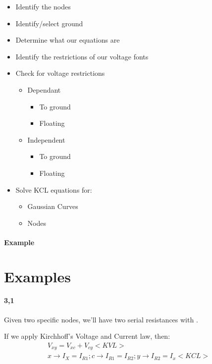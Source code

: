 \documentclass[11pt,fleqn]{book} %
\begin{document}
\begin{itemize}
    \item Identify the nodes
    \item Identify/select ground
    \item Determine what our equations are
    \item Identify the restrictions of our voltage fonts
    \item Check for voltage restrictions \begin{itemize}
        \item Dependant \begin{itemize}
            \item To ground
            \item Floating
        \end{itemize}
        \item Independent \begin{itemize}
            \item To ground 
            \item Floating
        \end{itemize}
    \end{itemize}
    \item Solve KCL equations for: \begin{itemize}
        \item Gaussian Curves
        \item Nodes
    \end{itemize}
\end{itemize}

\paragraph{Example}

\section{Examples}

\paragraph{3,1}

Given two specific nodes, we'll have two serial resistances with . 

If we apply Kirchhoff's Voltage and Current law, then:
\begin{gather}
    V_{xy} = V_{xc} + V_{cy} <KVL> \\
    x \to I_X = I_{R1} ; c \to I_{R1} = I_{R2} ; y \to I_{R2} = I_x <KCL>
\end{gather}
\end{document}
